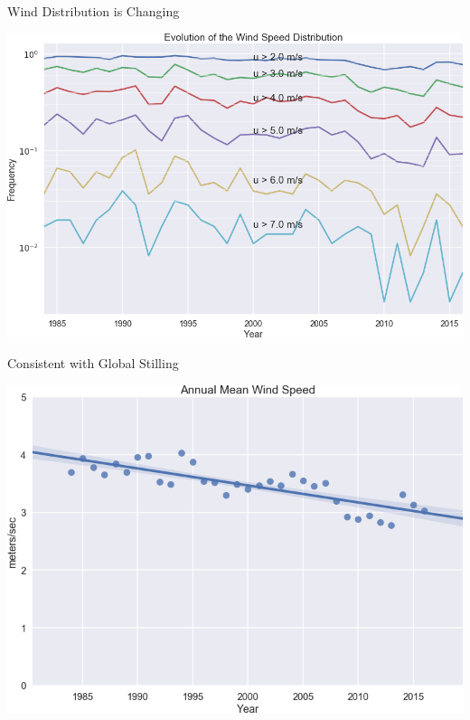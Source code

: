 \documentclass[compress,english]{beamer}
\begin{document}
\begin{frame}{Wind Distribution is Changing}

\begin{center}
\includegraphics[width=0.8\paperwidth]{WindDistribution.png}
\end{center}

\end{frame}

\begin{frame}{Consistent with Global Stilling}

\begin{center}
\includegraphics[width=0.8\paperwidth]{WindTrendLine.png}
\end{center}

\end{frame}
\end{document}
